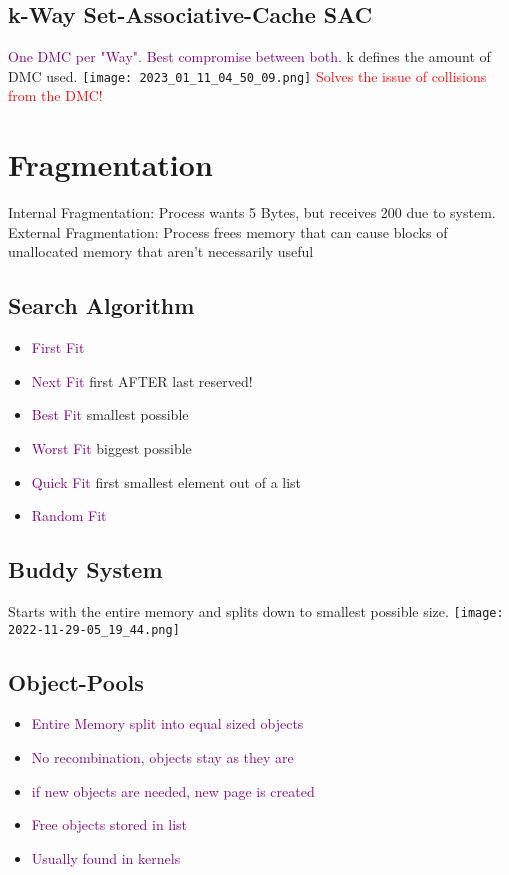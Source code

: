 \documentclass[main.tex,fontsize=7pt,paper=a4,paper=landscape,DIV=calc,]{scrartcl}
\begin{document}
\begin{multicols*}{4}
\subsection{k-Way Set-Associative-Cache SAC}
\textcolor{purple}{One DMC per "Way". Best compromise between both.}\newline
k defines the amount of DMC used.
\texttt{[image: 2023\_01\_11\_04\_50\_09.png]}
\textcolor{red}{Solves the issue of collisions from the DMC!}

\section{Fragmentation}
\textcolor{OliveGreen}{Internal Fragmentation:} Process wants 5 Bytes, but receives 200 due to system. \newline
\textcolor{OliveGreen}{External Fragmentation:} Process frees memory that can cause blocks of unallocated memory that aren't necessarily useful

\subsection{Search Algorithm}
\begin{itemize}
\item \textcolor{purple}{First Fit}
\item \textcolor{purple}{Next Fit} first AFTER last reserved!
\item \textcolor{purple}{Best Fit} smallest possible
\item \textcolor{purple}{Worst Fit} biggest possible
\item \textcolor{purple}{Quick Fit} \newline
  first smallest element out of a list
\item \textcolor{purple}{Random Fit}
\end{itemize} 

\subsection{Buddy System}
Starts with the entire memory and splits down to smallest possible size.\newline
\texttt{[image: 2022-11-29-05\_19\_44.png]}

\subsection{Object-Pools}
\begin{itemize}
\item \textcolor{purple}{Entire Memory split into equal sized objects}
\item \textcolor{purple}{No recombination, objects stay as they are}
\item \textcolor{purple}{if new objects are needed, new page is created}
\item \textcolor{purple}{Free objects stored in list}
\item \textcolor{purple}{Usually found in kernels}
\end{itemize} 


\end{multicols*}
\end{document}
